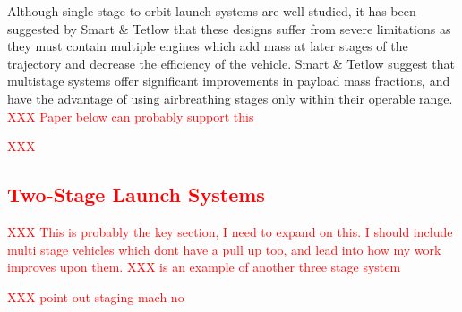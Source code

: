   	
  
  	
  	
  	
  	
  	Although single stage-to-orbit launch systems are well studied, it has been suggested by Smart \& Tetlow\cite{Smart2009} that these designs suffer from severe limitations as they must contain multiple engines which add mass at later stages of the trajectory and decrease the efficiency of the vehicle. Smart \& Tetlow suggest that multistage systems offer significant improvements in payload mass fractions, and have the advantage of using airbreathing stages only within their operable range. \textcolor{red}{XXX Paper below can probably support this}
  	
  	
  	
  \textcolor{red}{XXX 
  \subsection{Two-Stage Launch Systems}
}


\textcolor{red}{XXX This is probably the key section, I need to expand on this. I should include multi stage vehicles which dont have a pull up too, and lead into how my work improves upon them.}
\textcolor{red}{XXX \cite{Kimura1999} is an example of another three stage system}

\textcolor{red}{XXX point out staging mach no}


